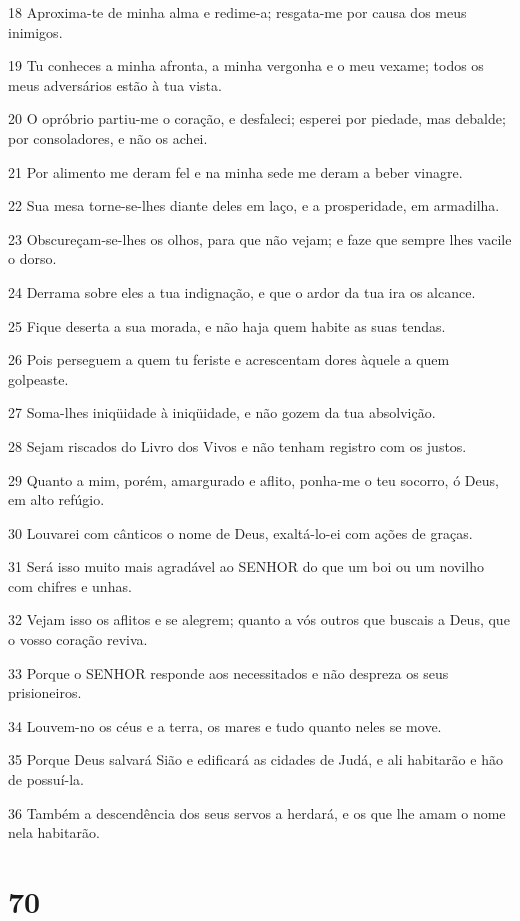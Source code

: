 \par 18 Aproxima-te de minha alma e redime-a; resgata-me por causa dos meus inimigos.
\par 19 Tu conheces a minha afronta, a minha vergonha e o meu vexame; todos os meus adversários estão à tua vista.
\par 20 O opróbrio partiu-me o coração, e desfaleci; esperei por piedade, mas debalde; por consoladores, e não os achei.
\par 21 Por alimento me deram fel e na minha sede me deram a beber vinagre.
\par 22 Sua mesa torne-se-lhes diante deles em laço, e a prosperidade, em armadilha.
\par 23 Obscureçam-se-lhes os olhos, para que não vejam; e faze que sempre lhes vacile o dorso.
\par 24 Derrama sobre eles a tua indignação, e que o ardor da tua ira os alcance.
\par 25 Fique deserta a sua morada, e não haja quem habite as suas tendas.
\par 26 Pois perseguem a quem tu feriste e acrescentam dores àquele a quem golpeaste.
\par 27 Soma-lhes iniqüidade à iniqüidade, e não gozem da tua absolvição.
\par 28 Sejam riscados do Livro dos Vivos e não tenham registro com os justos.
\par 29 Quanto a mim, porém, amargurado e aflito, ponha-me o teu socorro, ó Deus, em alto refúgio.
\par 30 Louvarei com cânticos o nome de Deus, exaltá-lo-ei com ações de graças.
\par 31 Será isso muito mais agradável ao SENHOR do que um boi ou um novilho com chifres e unhas.
\par 32 Vejam isso os aflitos e se alegrem; quanto a vós outros que buscais a Deus, que o vosso coração reviva.
\par 33 Porque o SENHOR responde aos necessitados e não despreza os seus prisioneiros.
\par 34 Louvem-no os céus e a terra, os mares e tudo quanto neles se move.
\par 35 Porque Deus salvará Sião e edificará as cidades de Judá, e ali habitarão e hão de possuí-la.
\par 36 Também a descendência dos seus servos a herdará, e os que lhe amam o nome nela habitarão.

\chapter{70}

